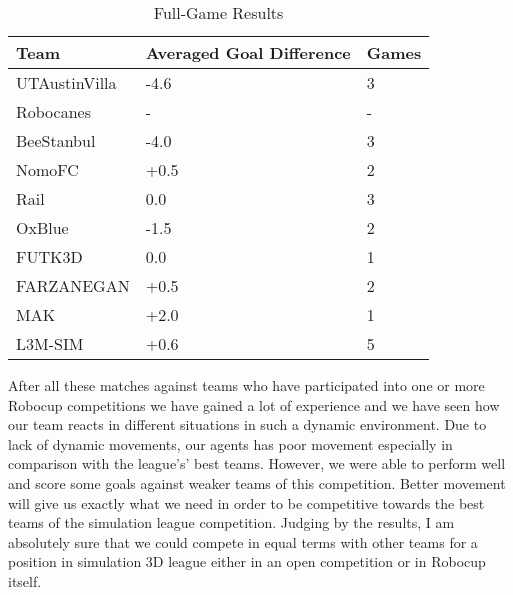 \begin{table}
\begin{center}
    \begin{tabular}{ | l | l | l | }
    \hline
    Team & Averaged Goal Difference & Games   \\ \hline
    UTAustinVilla 	& -4.6 		& 3 			\\ \hline	
    Robocanes 		& -			& - 			\\ \hline
    BeeStanbul		& -4.0		& 3				\\ \hline
    NomoFC 			& +0.5 		& 2 			\\ \hline
    Rail 			& 0.0 		& 3 			\\ \hline
    OxBlue 			& -1.5 		& 2 			\\ \hline
    FUTK3D 			& 0.0 		& 1 			\\ \hline
    FARZANEGAN 		& +0.5 		& 2 			\\ \hline
    MAK 			& +2.0 		& 1 			\\ \hline
    L3M-SIM			& +0.6 		& 5 			\\     
    \hline
    \end{tabular}
\end{center}
\label{GameResults}
\caption{Full-Game Results}
\end{table}


After all these matches against teams who have participated into one or more Robocup competitions we have gained a lot of experience and we have seen how our team reacts in different situations in such a dynamic environment. Due to lack of dynamic movements, our agents has poor movement especially in comparison with the league's' best teams. However, we were able to perform well and score some goals against weaker teams of this competition. Better movement will give us exactly what we need in order to be competitive  towards the best teams of the simulation league competition. Judging by the results, I am absolutely sure that we could compete in equal terms with other teams for a position in simulation 3D league either in an open competition or in Robocup itself.

